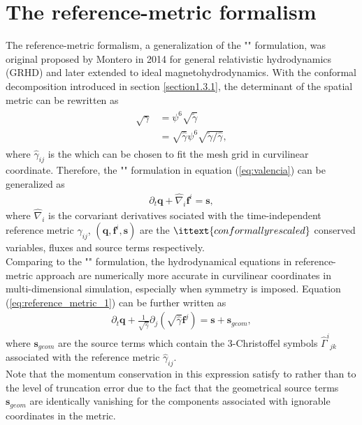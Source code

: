 \section{The reference-metric formalism} %
\label{section2.2}
The reference-metric formalism, a generalization of the "" formulation, was original proposed by Montero \cite{montero2014general} in 2014 for general relativistic hydrodynamics (GRHD)
and later extended to ideal magnetohydrodynamics.
With the conformal decomposition introduced in section \ref{section1.3.1},
the determinant of the spatial metric can be rewritten as
\begin{align}\label{eq:reference_metric_1}
    \begin{split}
    \sqrt{\gamma} &= \psi^6 \sqrt{\tilde{\gamma}} \\
    &= \sqrt{\hat{\gamma}} \psi^6 \sqrt{\tilde{\gamma}/\hat{\gamma}},
    \end{split}
\end{align}
where $\hat{\gamma}_{ij}$ is the 
which can be chosen to fit the mesh grid in curvilinear coordinate.
Therefore, the "" formulation in equation (\ref{eq:valencia}) can be generalized as
\begin{align}
    \partial_t \mathbf{q} + \hat{\nabla}_i \mathbf{f}^i = \mathbf{s},
\end{align}
where $\hat{\nabla}_i$ is the corvariant derivatives sociated with the time-independent reference metric $\hat{\gamma}_{ij}$,
$\left(\mathbf{q},\mathbf{f}^i,\mathbf{s}\right)$ are the $\ittext{conformally rescaled}$ conserved variables,
fluxes and source terms respectively.\\
Comparing to the "" formulation,
the hydrodynamical equations in reference-metric approach are numerically more accurate in curvilinear coordinates in multi-dimensional simulation,
especially when symmetry is imposed.
Equation (\ref{eq:reference_metric_1}) can be further written as
\begin{align}
    \partial_t \mathbf{q} + \frac{1}{\sqrt{\hat{\gamma}}}\partial_j \left(\sqrt{\hat{\gamma}} \mathbf{f}^j \right) = \mathbf{s} + \mathbf{s}_{geom},
\end{align}
where $\mathbf{s}_{geom}$ are the  source terms 
which contain the 3-Christoffel symbols $\hat{\Gamma}^i{}_{jk}$ associated with the reference metric $\hat{\gamma}_{ij}$. \\
Note that the momentum conservation in this expression satisfy to  rather than to the level of truncation error 
due to the fact that the geometrical source terms $\mathbf{s}_{geom}$ are identically vanishing 
for the components associated with ignorable coordinates in the metric.

